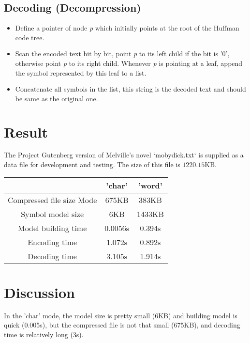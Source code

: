 \documentclass[journal, a4paper]{IEEEtran}
\begin{document}
    \subsection{Decoding (Decompression)}
        \begin{itemize}
            \item Define a pointer of node \textit{p} which initially points at the root of the Huffman code tree.
            \item Scan the encoded text bit by bit, point \textit{p} to its left child if the bit is '0', otherwise point \textit{p} to its right child. Whenever \textit{p} is pointing at a leaf, append the symbol represented by this leaf to a list.
            \item Concatenate all symbols in the list, this string is the decoded text and should be same as the original one.
        \end{itemize}

\section{Result}
	The Project Gutenberg version of Melville’s novel `mobydick.txt` is supplied as a data file for development and testing. The size of this file is $1220.15$KB.
	\begin{table}[!hbt]
		\begin{center}

		\begin{tabular}{|c|c|c|}
			\hline

			 & 'char' & 'word' \\
			\hline
			Compressed file size Mode&675KB &383KB \\
			\hline
			Symbol model size &6KB &1433KB \\
			\hline
			Model building time &0.0056s &0.394s\\
			\hline
			Encoding time &1.072s &0.892s\\
			\hline
			Decoding time &3.105s &1.914s\\
			\hline
		\end{tabular}
		\end{center}
	\end{table}

\section{Discussion}
    In the 'char' mode, the model size is pretty small (6KB) and building model is quick (0.005s), but the compressed file is not that small (675KB), and decoding time is relatively long (3s).
    
\end{document}
